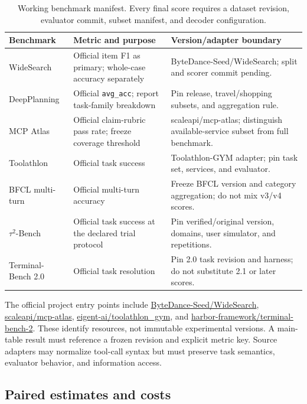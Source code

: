 \begin{table}[ht]
\centering\footnotesize
\caption{Working benchmark manifest. Every final score requires a dataset revision, evaluator commit, subset manifest, and decoder configuration.}
\label{tab:benchmark-manifest}
\begin{tabularx}{\linewidth}{lYY}
\toprule
Benchmark & Metric and purpose & Version/adapter boundary \\
\midrule
WideSearch & Official item F1 as primary; whole-case accuracy separately & ByteDance-Seed/WideSearch; split and scorer commit pending. \\
DeepPlanning & Official \texttt{avg\_acc}; report task-family breakdown & Pin release, travel/shopping subsets, and aggregation rule. \\
MCP Atlas & Official claim-rubric pass rate; freeze coverage threshold & scaleapi/mcp-atlas; distinguish available-service subset from full benchmark. \\
Toolathlon & Official task success & Toolathlon-GYM adapter; pin task set, services, and evaluator. \\
BFCL multi-turn & Official multi-turn accuracy & Freeze BFCL version and category aggregation; do not mix v3/v4 scores. \\
$\tau^2$-Bench & Official task success at the declared trial protocol & Pin verified/original version, domains, user simulator, and repetitions. \\
Terminal-Bench 2.0 & Official task resolution & Pin 2.0 task revision and harness; do not substitute 2.1 or later scores. \\
\bottomrule
\end{tabularx}
\end{table}

The official project entry points include \href{https://github.com/ByteDance-Seed/WideSearch}{ByteDance-Seed/WideSearch}, \href{https://github.com/scaleapi/mcp-atlas}{scaleapi/mcp-atlas}, \href{https://github.com/eigent-ai/toolathlon_gym}{eigent-ai/toolathlon\_gym}, and \href{https://github.com/harbor-framework/terminal-bench-2}{harbor-framework/terminal-bench-2}. These identify resources, not immutable experimental versions. A main-table result must reference a frozen revision and explicit metric key. Source adapters may normalize tool-call syntax but must preserve task semantics, evaluator behavior, and information access.

\subsection{Paired estimates and costs}
\label{app:statistics}

